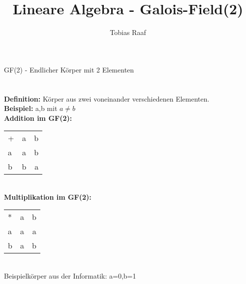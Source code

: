 \documentclass{scrartcl}
\title{Lineare Algebra - Galois-Field(2)}
\author{Tobias Raaf}
\begin{document}
\Large GF(2) - Endlicher Körper mit 2 Elementen\\\\
\normalsize\\
\textbf{Definition:} Körper aus zwei voneinander verschiedenen Elementen.\\
\textbf{Beispiel:} a,b mit $a\neq b$\\
\textbf{Addition im GF(2):}\\
	\begin{tabular}{lcr}
		+ & a & b\\
		a & a & b\\
		b & b & a\\
	\end{tabular}
\\\textbf{Multiplikation im GF(2):}\\
\begin{tabular}{lcr}
	* & a & b\\
	a & a & a\\
	b & a & b\\
\end{tabular}
\\Beispielkörper aus der Informatik: a=0,b=1\\
\end{document}
